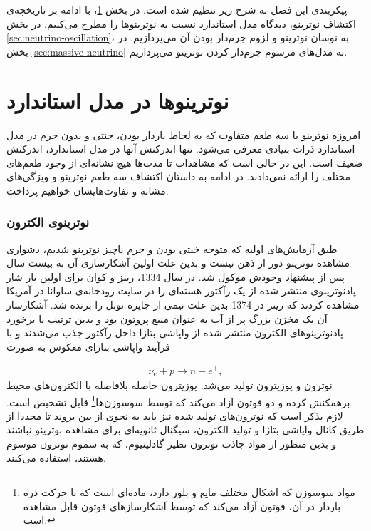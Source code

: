 \documentclass[a4paper]{book}
\begin{document}
پیکربندی این فصل به شرح زیر تنظیم شده است. در بخش \ref{sec:SM-neutrinos}، با ادامه بر تاریخچه‌ی اکتشاف نوترینو، دیدگاه مدل استاندارد نسبت به نوترینوها را مطرح می‌کنیم. در بخش \ref{sec:neutrino-oscillation}، به نوسان نوترینو و لزوم جرم‌دار بودن آن می‌پردازیم. در بخش \ref{sec:massive-neutrino} به مدل‌های مرسوم جرم‌دار کردن نوترینو می‌پردازیم.

\section{نوترینوها در مدل استاندارد}
\label{sec:SM-neutrinos}
امروزه نوترینو با سه طعم متفاوت که به لحاظ باردار بودن، خنثی و بدون جرم در مدل استاندارد ذرات بنیادی معرفی می‌شود. تنها اندرکنش آنها در مدل استاندارد، اندرکنش ضعیف است. این در حالی است که مشاهدات تا مدت‌ها هیچ نشانه‌ای از وجود طعم‌های مختلف را ارائه نمی‌دادند. در ادامه به داستان اکتشاف سه طعم نوترینو و ویژگی‌های مشابه و تفاوت‌هایشان خواهیم پرداخت.
\subsubsection{نوترینوی الکترون}
طبق آزمایش‌های اولیه که متوجه خنثی بودن و جرم ناچیز نوترینو شدیم، دشواری مشاهده نوترینو دور از ذهن نیست و بدین علت اولین آشکارسازی آن به بیست سال پس از پیشنهاد وجودش موکول شد. در سال 1334، رینز و کوان برای اولین بار شار پادنوترینوی منتشر شده از یک رآکتور هسته‌ای را در سایت رودخانه‌ی ساوانا در آمریکا مشاهده کردند \cite{SRS} که رینز در 1374 بدین علت نیمی از جایزه نوبل را برنده شد.
آشکارساز آن یک مخزن بزرگ پر از آب به عنوان منبع پروتون بود و بدین ترتیب با برخورد پادنوترینوهای الکترون منتشر شده از واپاشی بتازا داخل رآکتور جذب می‌شدند و با فرآیند واپاشی بتازای معکوس به صورت
\par
\vspace{-0.5cm}
{\footnotesize\begin{align}
	\overline{\nu}_e + p \to n + e^+,
	\label{pro:inverse-beta-decay}
\end{align}}
نوترون و پوزیترون تولید می‌شد. پوزیترون حاصله بلافاصله با الکترون‌های محیط برهمکنش کرده و دو فوتون آزاد می‌کند که توسط سوسوزن‌ها\footnote{مواد سوسوزن که اشکال مختلف مایع و بلور دارد، ماده‌ای است که با حرکت ذره باردار در آن، فوتون آزاد می‌کند که توسط آشکارسازهای فوتون قابل مشاهده است.} قابل تشخیص است. لازم بذکر است که نوترون‌های تولید شده نیز باید به نحوی از بین بروند تا مجددا از طریق کانال واپاشی بتازا و تولید الکترون، سیگنال ثانویه‌ای برای مشاهده نوترینو نباشند و بدین منظور از مواد جاذب نوترون نظیر گادلینیوم، که به سموم نوترون موسوم هستند، استفاده می‌کنند.
		
\end{document}
